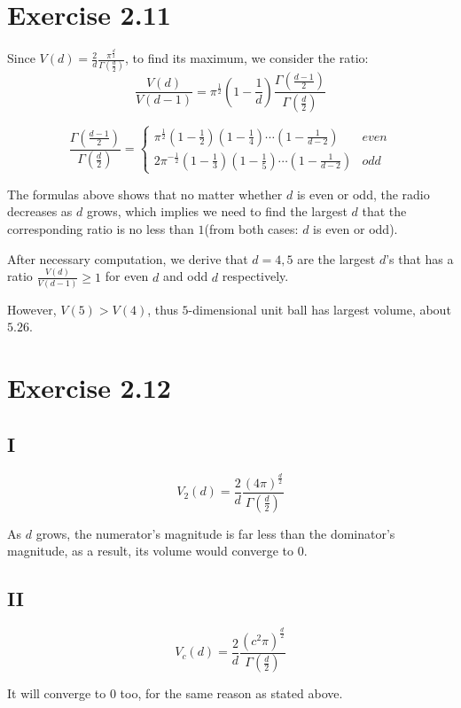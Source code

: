 \documentclass[paper=a4, fontsize=11pt]{scrartcl} %
\numberwithin{equation}{section} %
\numberwithin{figure}{section} %
\numberwithin{table}{section} %
\begin{document}
\section*{Exercise 2.11}
Since $V(d) = \frac{2}{d}\frac{\pi^{\frac{d}{2}}}{\Gamma\left(\frac{d}{2}\right)}$, to find its maximum, we consider the ratio:
$$\frac{V(d)}{V(d-1)} = \pi^\frac{1}{2}\left(1 - \frac{1}{d}\right)\frac{\Gamma\left(\frac{d-1}{2}\right)}{\Gamma\left(\frac{d}{2}\right)}  $$

$$\frac{\Gamma\left(\frac{d-1}{2}\right)}{\Gamma\left(\frac{d}{2}\right)} = \left\{\begin{array}{ll} 
\pi^{\frac{1}{2}}\left(1 - \frac{1}{2}\right)\left(1 - \frac{1}{4}\right)\cdots \left(1 - \frac{1}{d - 2}\right) & \textit{even}\\
2\pi^{-\frac{1}{2}} \left(1 - \frac{1}{3}\right)\left(1 - \frac{1}{5}\right)\cdots \left(1 - \frac{1}{d - 2}\right) & \textit{odd}
\end{array}\right.$$

The formulas above shows that no matter whether $d$ is even or odd, the radio decreases as $d$ grows, which implies we need to find the largest $d$ that the corresponding ratio is no less than $1$(from both cases: $d$ is even or odd).

After necessary computation, we derive that $d = 4, 5$ are the largest $d$'s that has a ratio $\frac{V(d)}{V(d-1)}\geq 1$ for even $d$ and odd $d$ respectively.

However, $V(5) > V(4)$, thus $5$-dimensional unit ball has largest volume, about $5.26$.
\section*{Exercise 2.12}
\subsection*{I}
$$V_2(d) = \frac{2}{d}\frac{\left(4\pi\right)^{\frac{d}{2}}}{\Gamma\left(\frac{d}{2}\right)}$$

As $d$ grows, the numerator's magnitude is far less than the dominator's magnitude, as a result, its volume would converge to $0$.
\subsection*{II}
$$V_c(d) = \frac{2}{d}\frac{\left(c^2\pi\right)^{\frac{d}{2}}}{\Gamma\left(\frac{d}{2}\right)}$$

It will converge to $0$ too, for the same reason as stated above.
\end{document}
